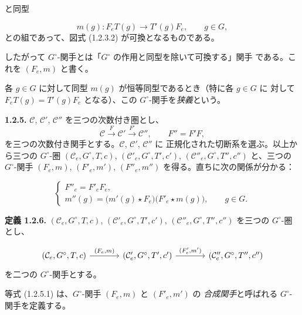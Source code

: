 \clearpage
{}%
と同型

\[
  m(g)\colon F_eT(g)\longrightarrow T'(g)F_e,
  \qquad g\in G,
\]
との組であって、図式 (1.2.3.2) が可換となるものである。

したがって $G^\circ$-関手とは「$G^\circ$ の作用と同型を除いて可換する」関手
である。これを $(F_e,m)$ と書く。

各 $g\in G$ に対して同型 $m(g)$ が恒等同型であるとき（特に各 $g\in G$ に
対して $F_eT(g)=T'(g)F_e$ となる）、この $G^\circ$-関手を\emph{狭義}という。

\noindent\textbf{1.2.5.}\quad
$\mathcal C$, $\mathcal C'$, $\mathcal C''$ を三つの次数付き圏とし、
\[
  \mathcal C\xrightarrow{F}\mathcal C'
  \xrightarrow{F'}\mathcal C'',\qquad F''=F'F,
\]
を三つの次数付き関手とする。$\mathcal C$, $\mathcal C'$, $\mathcal C''$ に
正規化された切断系を選ぶ。以上から三つの $G^\circ$-圏
$(\mathcal C_e,G^\circ,T,c)$,
$(\mathcal C'_e,G^\circ,T',c')$,
$(\mathcal C''_e,G^\circ,T'',c'')$ と、三つの $G^\circ$-関手
$(F_e,m)$, $(F'_e,m')$, $(F''_e,m'')$ を得る。直ちに次の関係が分かる：

\begin{equation}
  \begin{cases}
    F''_e=F'_eF_e,\\[0.5em]
    m''(g)=\bigl(m'(g)\star F_e\bigr)
      \bigl(F'_e\star m(g)\bigr),\qquad g\in G.
  \end{cases}
  \tag{1.2.5.1}
\end{equation}

\noindent\textbf{定義 1.2.6.}\quad
$(\mathcal C_e,G^\circ,T,c)$,
$(\mathcal C'_e,G^\circ,T',c')$,
$(\mathcal C''_e,G^\circ,T'',c'')$ を三つの $G^\circ$-圏とし、

\[
\begin{tikzcd}[column sep=large]
(\mathcal C_e,G^\circ,T,c)
  \arrow[r,"{(F_e,m)}"]
&
(\mathcal C'_e,G^\circ,T',c')
  \arrow[r,"{(F_e^{\prime},m^{\prime})}"]
&
(\mathcal C''_e,G^\circ,T'',c'')
\end{tikzcd}
\]
を二つの $G^\circ$-関手とする。

等式 (1.2.5.1) は、$G^\circ$-関手 $(F_e,m)$ と $(F'_e,m')$ の
\emph{合成関手}と呼ばれる $G^\circ$-関手を定義する。

